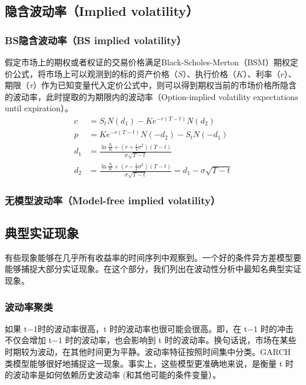 \documentclass[11pt]{article}
\begin{document}

\subsection{隐含波动率（Implied volatility）}

\subsubsection{BS隐含波动率（BS implied volatility）}

假定市场上的期权或者权证的交易价格满足Black-Scholes-Merton（BSM）期权定价公式，将市场上可以观测到的标的资产价格（$S$）、执行价格（$K$）、利率（$r$）、期限（$\tau$）作为已知变量代入定价公式中，则可以得到期权当前的市场价格所隐含的波动率，此时提取的为期限内的波动率（Option-implied volatility expectations until expiration）。
\begin{align*}
    c &= S_t N(d_1) - Ke^{-r(T-t)} N(d_2) \\
    p & = K e^{-r(T-t)}N(-d_2) - S_t N(-d_1) \\
    d_1 &= \frac{\ln \frac{S_t}{K} + (r+\frac{1}{2}\sigma^2)(T-t)}{\sigma\sqrt{T-t}} \\
    d_2 &= \frac{\ln \frac{S_t}{K} + (r-\frac{1}{2}\sigma^2)(T-t)}{\sigma\sqrt{T-t}} = d_1 - \sigma\sqrt{T-t}
\end{align*}

\subsubsection{无模型波动率（Model-free implied volatility）}

\subsection{典型实证现象}

有些现象能够在几乎所有收益率的时间序列中观察到。一个好的条件异方差模型要能够捕捉大部分实证现象。在这个部分，我们列出在波动性分析中最知名典型实证现象。

\subsubsection{波动率聚类}

如果 t−1时的波动率很高，t 时的波动率也很可能会很高。即，在 t−1 时的冲击不仅会增加 t−1 时的波动率，也会影响到 t 时的波动率。换句话说，市场在某些时期较为波动，在其他时间更为平静。波动率特征按照时间集中分类。GARCH 类模型能够很好地捕捉这一现象。事实上，这些模型更准确地来说，是衡量 t 时的波动率是如何依赖历史波动率 (和其他可能的条件变量）。
\end{document}
